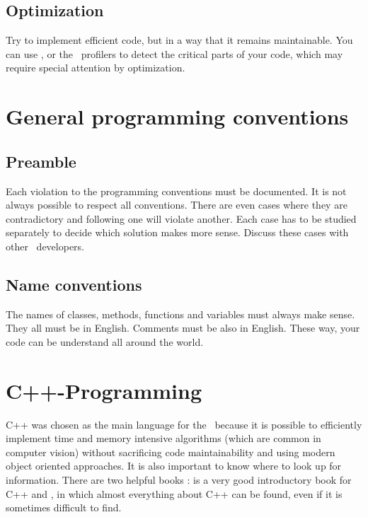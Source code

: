 \subsection{Optimization}

Try to implement efficient code, but in a way that it remains
maintainable.  You can use ,  or the
\visualc\ profilers to detect the critical parts of your code, which
may require special attention by optimization.

\section{General programming conventions}

\subsection{Preamble}

Each violation to the programming conventions must be documented.  It is not
always possible to respect all conventions.  There are even cases where they
are contradictory and following one will violate another.  Each case has to
be studied separately to decide which solution makes more sense.  Discuss
these cases with other \ltilib\ developers.

\subsection{Name conventions}

The names of classes, methods, functions and variables must always make sense.
They all must be in English.  Comments must be also in English.  These way,
your code can be understand all around the world.

\section{C++-Programming}

C++ was chosen as the main language for the \ltilib\ because it is possible to
efficiently implement time and memory intensive algorithms (which are common
in computer vision) without sacrificing code maintainability and using modern
object oriented approaches.  It is also important to know where to look up for
information.  There are two helpful books : \cite{primer} is
a very good introductory book for C++ and \cite{stroustrup}, in which almost
everything about C++ can be found, even if it is sometimes difficult to find.

